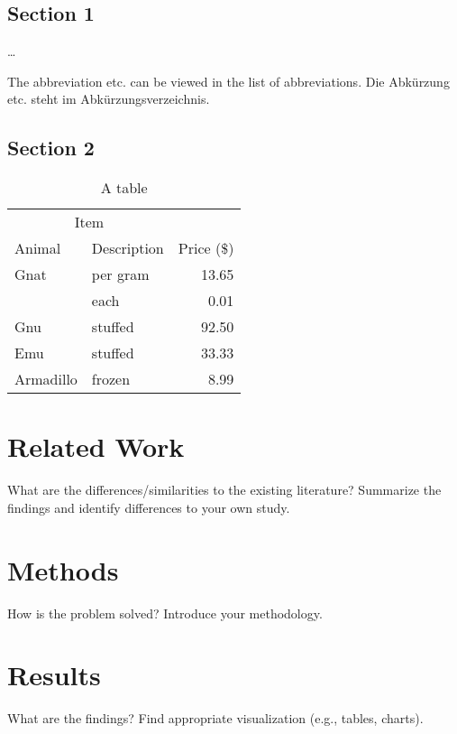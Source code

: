 \documentclass{thesisclass}
\begin{document}
\section{Section 1}
\label{ch:Content1:sec:Section1}

\dots

{The abbreviation etc.  can be viewed in the list of abbreviations.}
{Die Abkürzung etc. steht im Abkürzungsverzeichnis.}



\section{Section 2}
\label{ch:Content1:sec:Section2}

\begin{table}[htb]
\centering
\begin{tabular}{llr}
\toprule
\multicolumn{2}{c}{Item} \\
\cmidrule(r){1-2}
Animal    & Description & Price (\$) \\
\midrule
Gnat      & per gram    & 13.65      \\
          & each        & 0.01       \\
Gnu       & stuffed     & 92.50      \\
Emu       & stuffed     & 33.33      \\
Armadillo & frozen      & 8.99       \\
\bottomrule
\end{tabular}
\caption{A table}
\end{table}

\chapter{Related Work} What are the differences/similarities to the existing literature? Summarize the findings and identify differences to your own study.

\chapter{Methods} How is the problem solved? Introduce your methodology.
\chapter{Results} What are the findings? Find appropriate visualization (e.g., tables, charts).
\end{document}
